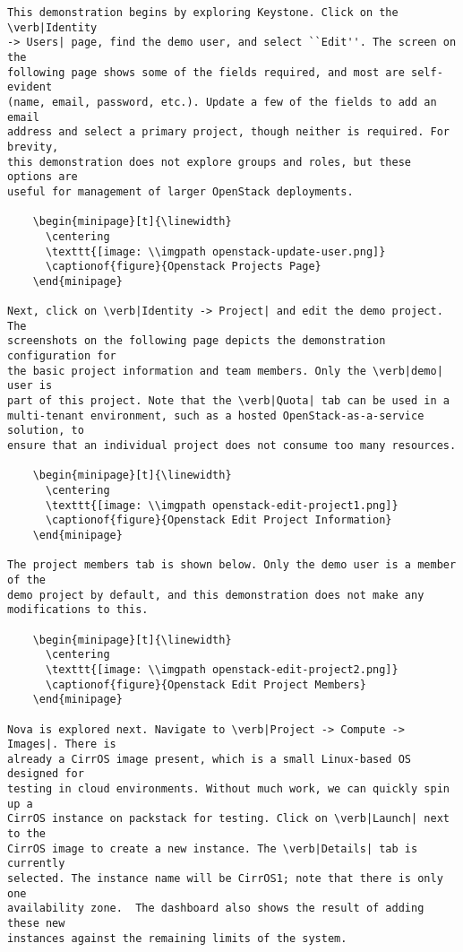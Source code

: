 \begin{verbatim}
This demonstration begins by exploring Keystone. Click on the \verb|Identity
-> Users| page, find the demo user, and select ``Edit''. The screen on the
following page shows some of the fields required, and most are self-evident
(name, email, password, etc.). Update a few of the fields to add an email
address and select a primary project, though neither is required. For brevity,
this demonstration does not explore groups and roles, but these options are
useful for management of larger OpenStack deployments.

    \begin{minipage}[t]{\linewidth}
	  \centering
      \texttt{[image: \\imgpath openstack-update-user.png]}
      \captionof{figure}{Openstack Projects Page}
    \end{minipage}

Next, click on \verb|Identity -> Project| and edit the demo project. The
screenshots on the following page depicts the demonstration configuration for
the basic project information and team members. Only the \verb|demo| user is
part of this project. Note that the \verb|Quota| tab can be used in a
multi-tenant environment, such as a hosted OpenStack-as-a-service solution, to
ensure that an individual project does not consume too many resources.

    \begin{minipage}[t]{\linewidth}
	  \centering
      \texttt{[image: \\imgpath openstack-edit-project1.png]}
      \captionof{figure}{Openstack Edit Project Information}
    \end{minipage}

The project members tab is shown below. Only the demo user is a member of the
demo project by default, and this demonstration does not make any
modifications to this.

    \begin{minipage}[t]{\linewidth}
	  \centering
      \texttt{[image: \\imgpath openstack-edit-project2.png]}
      \captionof{figure}{Openstack Edit Project Members}
    \end{minipage}

Nova is explored next. Navigate to \verb|Project -> Compute -> Images|. There is
already a CirrOS image present, which is a small Linux-based OS designed for
testing in cloud environments. Without much work, we can quickly spin up a
CirrOS instance on packstack for testing. Click on \verb|Launch| next to the
CirrOS image to create a new instance. The \verb|Details| tab is currently
selected. The instance name will be CirrOS1; note that there is only one
availability zone.  The dashboard also shows the result of adding these new
instances against the remaining limits of the system.


\end{verbatim}
